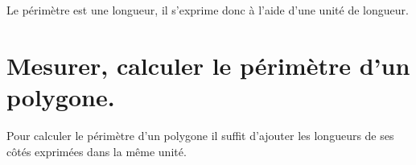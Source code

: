 \documentclass[a4paper,dvipsnames]{article}
\begin{document}
\begin{Rq}
Le périmètre est une longueur, il s'exprime donc à l'aide d'une unité de longueur.
\end{Rq}

\section{Mesurer, calculer le périmètre d'un polygone.}

\begin{Mt}
Pour calculer le périmètre d'un polygone il suffit d'ajouter les longueurs de ses côtés exprimées dans la même unité.
\end{Mt}

\begin{ExOApp}
\begin{enumerate}


\end{enumerate}
\end{ExOApp}
\end{document}
